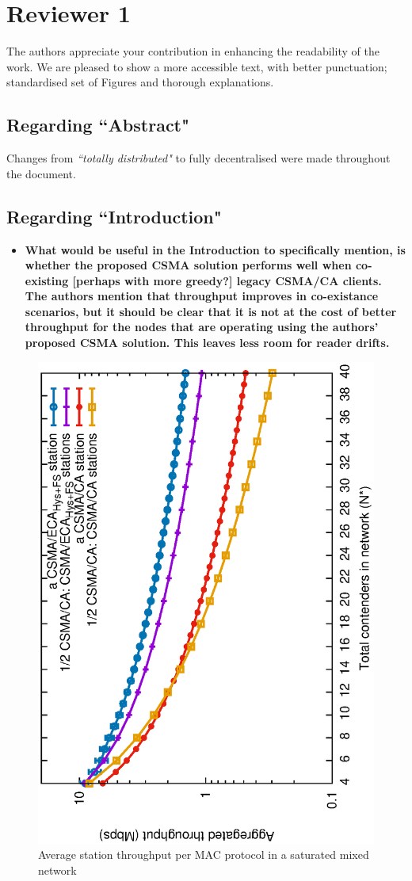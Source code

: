 \documentclass[]{article}
\begin{document}
\section{Reviewer 1}
The authors appreciate your contribution in enhancing the readability of the work. We are pleased to show a more accessible text, with better punctuation; standardised set of Figures and thorough explanations. 


	\subsection{Regarding ``Abstract"}
		Changes from \emph{``totally distributed"} to fully decentralised were made throughout the document.
	
	\subsection{Regarding ``Introduction"}
		\begin{itemize}
			\item {\bfseries What would be useful in the Introduction to specifically mention, is whether the proposed CSMA solution performs well when co-existing [perhaps with more greedy?] legacy CSMA/CA clients. The authors mention that throughput improves in co-existance scenarios, but it should be clear that it is not at the cost of better throughput for the nodes that are operating using the authors' proposed CSMA solution. This leaves less room for reader drifts.}
		\end{itemize}
		
		\begin{figure}[tb]
		\centering
			\includegraphics[width=0.45\linewidth,angle=-90]{figures/saturated/mixed/throughput-per-protocol/throughput-per-protocol-TON.eps}
			\caption{Average station throughput per MAC protocol in a saturated mixed network}
			\label{fig:coex}
		\end{figure}
		
\end{document}
